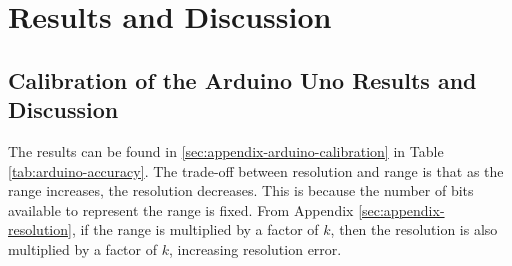 \section{Results and Discussion}

\subsection{Calibration of the Arduino Uno Results and Discussion}
\noindent The results can be found in \ref{sec:appendix-arduino-calibration} in Table \ref{tab:arduino-accuracy}.
The trade-off between resolution and range is that as the range increases, the resolution decreases. This is because the number of bits
available to represent the range is fixed. From Appendix \ref{sec:appendix-resolution}, if the range is multiplied by a factor of $k$, then the resolution is also multiplied by a factor of $k$, increasing resolution error.

